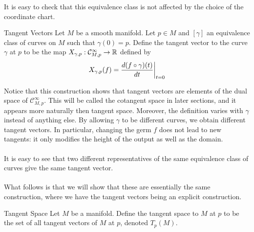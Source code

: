 \documentclass[a4paper]{article}
\begin{document}
It is easy to check that this equivalence class is not affected by the choice of the coordinate chart. 

\begin{defn}{Tangent Vectors}{} Let $M$ be a smooth manifold. Let $p\in M$ and $[\gamma]$ an equivalence class of curves on $M$ such that $\gamma(0)=p$. Define the tangent vector to the curve $\gamma$ at $p$ to be the map $X_{\gamma,p}:\mathcal{C}_{M,p}^\infty\to\mathbb{R}$ defined by $$X_{\gamma,p}(f)=\frac{d(f\circ\gamma)(t)}{dt}\bigg{|}_{t=0}$$
\end{defn}

Notice that this construction shows that tangent vectors are elements of the dual space of $\mathcal{C}_{M,p}^\infty$. This will be called the cotangent space in later sections, and it appears more naturally then tangent space. Moreover, the definition varies with $\gamma$ instead of anything else. By allowing $\gamma$ to be different curves, we obtain different tangent vectors. In particular, changing the germ $f$ does not lead to new tangents: it only modifies the height of the output as well as the domain. \\~\\

It is easy to see that two different representatives of the same equivalence class of curves give the same tangent vector. \\~\\

What follows is that we will show that these are essentially the same construction, where we have the tangent vectors being an explicit construction. 

\begin{defn}{Tangent Space}{} Let $M$ be a manifold. Define the tangent space to $M$ at $p$ to be the set of all tangent vectors of $M$ at $p$, denoted $T_p(M)$. 
\end{defn}
\end{document}
